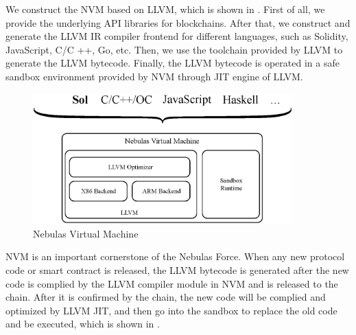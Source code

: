 We construct the NVM based on LLVM, which is shown in . First of all, we provide the underlying API libraries for blockchains. After that, we construct and generate the LLVM IR compiler frontend for different languages, such as Solidity, JavaScript, C/C ++, Go, etc. Then, we use the toolchain provided by LLVM to generate the LLVM bytecode. Finally, the LLVM bytecode is operated in a safe sandbox environment provided by NVM through JIT engine of LLVM.


\begin{figure}[h]
\centering
\includegraphics[width=10cm]{./figs/nvm}
\caption{Nebulas Virtual Machine}
\label{fig:nvm}
\end{figure}

NVM is an important cornerstone of the Nebulas Force. When any new protocol code or smart contract is released, the LLVM bytecode is generated after the new code is complied by the LLVM compiler module in NVM and is released to the chain. After it is confirmed by the chain, the new code will be complied and optimized by LLVM JIT, and then go into the sandbox to replace the old code and be executed, which is shown in .


